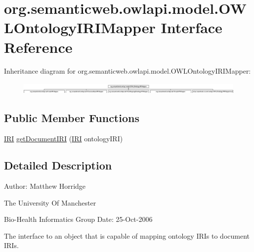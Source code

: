 \hypertarget{interfaceorg_1_1semanticweb_1_1owlapi_1_1model_1_1_o_w_l_ontology_i_r_i_mapper}{\section{org.\-semanticweb.\-owlapi.\-model.\-O\-W\-L\-Ontology\-I\-R\-I\-Mapper Interface Reference}
\label{interfaceorg_1_1semanticweb_1_1owlapi_1_1model_1_1_o_w_l_ontology_i_r_i_mapper}
}
Inheritance diagram for org.\-semanticweb.\-owlapi.\-model.\-O\-W\-L\-Ontology\-I\-R\-I\-Mapper\-:\begin{figure}[H]
\begin{center}
\leavevmode
\includegraphics[height=0.617080cm]{interfaceorg_1_1semanticweb_1_1owlapi_1_1model_1_1_o_w_l_ontology_i_r_i_mapper}
\end{center}
\end{figure}
\subsection*{Public Member Functions}
\begin{DoxyCompactItemize}
\item 
\hyperlink{classorg_1_1semanticweb_1_1owlapi_1_1model_1_1_i_r_i}{I\-R\-I} \hyperlink{interfaceorg_1_1semanticweb_1_1owlapi_1_1model_1_1_o_w_l_ontology_i_r_i_mapper_ae459e4dcc9ba63f667a03798a9ebaef3}{get\-Document\-I\-R\-I} (\hyperlink{classorg_1_1semanticweb_1_1owlapi_1_1model_1_1_i_r_i}{I\-R\-I} ontology\-I\-R\-I)
\end{DoxyCompactItemize}


\subsection{Detailed Description}
Author\-: Matthew Horridge\par
 The University Of Manchester\par
 Bio-\/\-Health Informatics Group Date\-: 25-\/\-Oct-\/2006

The interface to an object that is capable of mapping ontology I\-R\-Is to document I\-R\-Is. 

